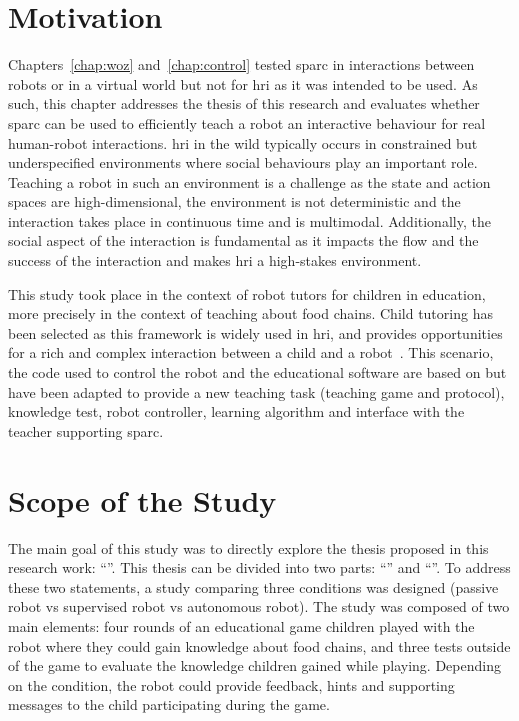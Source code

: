 \newpage

\section{Motivation}

Chapters~\ref{chap:woz} and~\ref{chap:control} tested \gls{sparc} in interactions between robots or in a virtual world but not for \gls{hri} as it was intended to be used. As such, this chapter addresses the thesis of this research and evaluates whether \gls{sparc} can be used to efficiently teach a robot an interactive behaviour for real human-robot interactions. \gls{hri} in the wild typically occurs in constrained but underspecified environments where social behaviours play an important role. Teaching a robot in such an environment is a challenge as the state and action spaces are high-dimensional, the environment is not deterministic and the interaction takes place in continuous time and is multimodal. Additionally, the social aspect of the interaction is fundamental as it impacts the flow and the success of the interaction and makes \gls{hri} a high-stakes environment.

This study took place in the context of robot tutors for children in education, more precisely in the context of teaching about food chains. Child tutoring has been selected as this framework is widely used in \gls{hri}, and provides opportunities for a rich and complex interaction between a child and a robot~\citep{leyzberg2012physical,kennedy2015robot,belpaeme2018social}. This scenario, the code used to control the robot and the educational software are based on \cite{lemaignan2018pinsoro} but have been adapted to provide a new teaching task (teaching game and protocol), knowledge test, robot controller, learning algorithm and interface with the teacher supporting \gls{sparc}.

\section{Scope of the Study} \label{sec:tutoring_scope}

The main goal of this study was to directly explore the thesis proposed in this research work: ``\thesis''. This thesis can be divided into two parts: ``\QI'' and ``\QII''. To address these two statements, a study comparing three conditions was designed (passive robot vs supervised robot vs autonomous robot). The study was composed of two main elements: four rounds of an educational game children played with the robot where they could gain knowledge about food chains, and three tests outside of the game to evaluate the knowledge children gained while playing. Depending on the condition, the robot could provide feedback, hints and supporting messages to the child participating during the game. 

